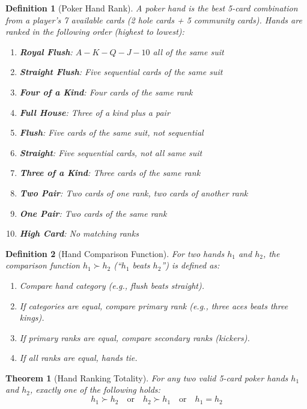 \documentclass[11pt,a4paper]{article}
\newtheorem{definition}{Definition}[section]
\newtheorem{theorem}{Theorem}[section]
\begin{document}
\begin{definition}[Poker Hand Rank]
\label{def:hand-rank}
A poker hand is the best 5-card combination from a player's 7 available cards (2 hole cards + 5 community cards). Hands are ranked in the following order (highest to lowest):
\begin{enumerate}
    \item \textbf{Royal Flush}: $A-K-Q-J-10$ all of the same suit
    \item \textbf{Straight Flush}: Five sequential cards of the same suit
    \item \textbf{Four of a Kind}: Four cards of the same rank
    \item \textbf{Full House}: Three of a kind plus a pair
    \item \textbf{Flush}: Five cards of the same suit, not sequential
    \item \textbf{Straight}: Five sequential cards, not all same suit
    \item \textbf{Three of a Kind}: Three cards of the same rank
    \item \textbf{Two Pair}: Two cards of one rank, two cards of another rank
    \item \textbf{One Pair}: Two cards of the same rank
    \item \textbf{High Card}: No matching ranks
\end{enumerate}
\end{definition}

\begin{definition}[Hand Comparison Function]
\label{def:hand-compare}
For two hands $h_1$ and $h_2$, the comparison function $h_1 \succ h_2$ (``$h_1$ beats $h_2$'') is defined as:
\begin{enumerate}
    \item Compare hand category (e.g., flush beats straight).
    \item If categories are equal, compare primary rank (e.g., three aces beats three kings).
    \item If primary ranks are equal, compare secondary ranks (kickers).
    \item If all ranks are equal, hands tie.
\end{enumerate}
\end{definition}

\begin{theorem}[Hand Ranking Totality]
\label{thm:hand-totality}
For any two valid 5-card poker hands $h_1$ and $h_2$, exactly one of the following holds:
\[
h_1 \succ h_2 \quad \text{or} \quad h_2 \succ h_1 \quad \text{or} \quad h_1 = h_2
\]
\end{theorem}
\end{document}
